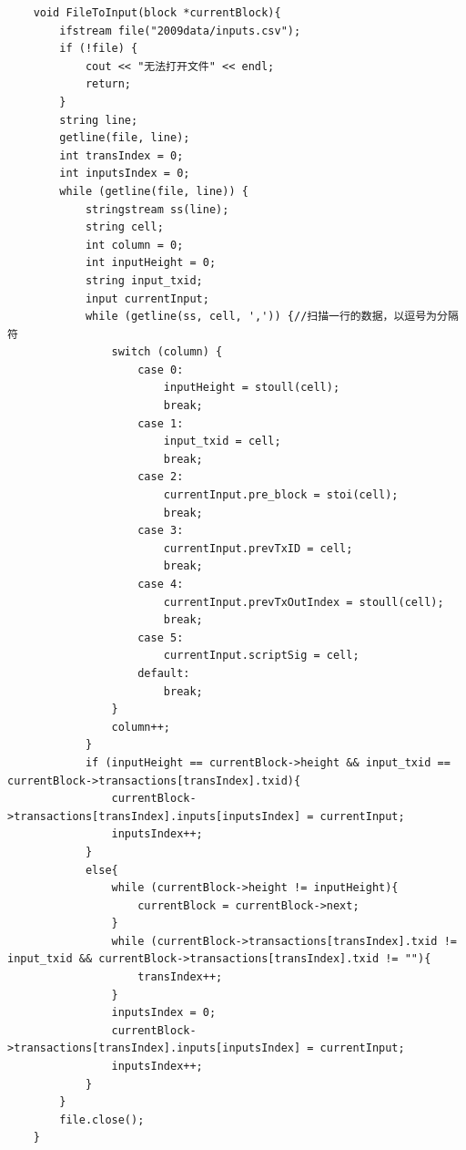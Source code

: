 \documentclass[10pt,a4paper]{article}
\begin{document}
\begin{verbatim}
    void FileToInput(block *currentBlock){
        ifstream file("2009data/inputs.csv");
        if (!file) {
            cout << "无法打开文件" << endl;
            return;
        }
        string line;
        getline(file, line);
        int transIndex = 0;
        int inputsIndex = 0;
        while (getline(file, line)) {
            stringstream ss(line);
            string cell;
            int column = 0;
            int inputHeight = 0;
            string input_txid;
            input currentInput;
            while (getline(ss, cell, ',')) {//扫描一行的数据，以逗号为分隔符
                switch (column) {
                    case 0:
                        inputHeight = stoull(cell);
                        break;
                    case 1:
                        input_txid = cell;
                        break;
                    case 2:
                        currentInput.pre_block = stoi(cell);
                        break;
                    case 3:
                        currentInput.prevTxID = cell;
                        break;
                    case 4:
                        currentInput.prevTxOutIndex = stoull(cell);
                        break;
                    case 5:
                        currentInput.scriptSig = cell;
                    default:
                        break;
                }
                column++;
            }
            if (inputHeight == currentBlock->height && input_txid == currentBlock->transactions[transIndex].txid){
                currentBlock->transactions[transIndex].inputs[inputsIndex] = currentInput;
                inputsIndex++;
            }
            else{
                while (currentBlock->height != inputHeight){
                    currentBlock = currentBlock->next;
                }
                while (currentBlock->transactions[transIndex].txid != input_txid && currentBlock->transactions[transIndex].txid != ""){
                    transIndex++;
                }
                inputsIndex = 0;
                currentBlock->transactions[transIndex].inputs[inputsIndex] = currentInput;
                inputsIndex++;
            }
        }
        file.close();
    }
    

\end{verbatim}
\end{document}
